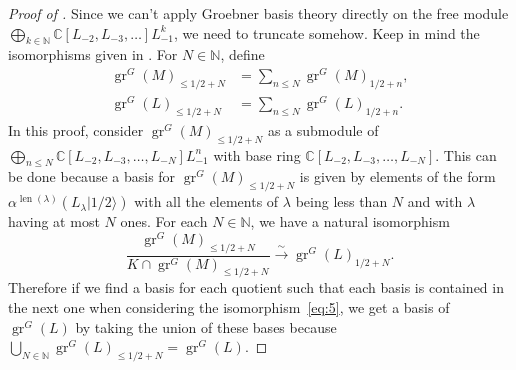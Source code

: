 \documentclass[12pt, a4paper]{article}
\DeclareMathOperator{\gr}{gr}
\DeclareMathOperator{\len}{len}
\newcommand{\vachalf}{|1/2\rangle}
\begin{document}
\begin{proof}[Proof of ]
  Since we can't apply Groebner basis theory directly on the free module $\bigoplus_{k\in \mathbb{N}}\mathbb{C}[L_{-2},L_{-3},\dots]L_{-1}^k$, we need to truncate somehow.
  Keep in mind the isomorphisms given in .
  For $N \in \mathbb{N}$, define
  \begin{align*}
    \gr^G(M)_{\le 1/2 + N} &= \sum_{n \le N}\gr^G(M)_{1/2 + n}, \\
    \gr^G(L)_{\le 1/2 + N} &= \sum_{n \le N}\gr^G(L)_{1/2 + n}.
  \end{align*}
  In this proof, consider $\gr^G(M)_{\le 1/2 + N}$ as a submodule of $\bigoplus_{n \le N}\mathbb{C}[L_{-2}, L_{-3}, \dots, L_{-N}]L_{-1}^n$ with base ring $\mathbb{C}[L_{-2}, L_{-3}, \dots, L_{-N}]$.
  This can be done because a basis for $\gr^G(M)_{\le 1/2 + N}$ is given by elements of the form $\alpha^{\len(\lambda)}(L_\lambda\vachalf)$ with all the elements of $\lambda$ being less than $N$ and with $\lambda$ having at most $N$ ones.
  For each $N \in \mathbb{N}$, we have a natural isomorphism
  \begin{equation}
    \label{eq:5}
    \frac{\gr^G(M)_{\le 1/2 + N}}{K \cap \gr^G(M)_{\le 1/2 + N}} \xrightarrow{\sim} \gr^G(L)_{1/2 + N}.
  \end{equation}
  Therefore if we find a basis for each quotient such that each basis is contained in the next one when considering the isomorphism~\eqref{eq:5}, we get a basis of $\gr^G(L)$ by taking the union of these bases because $\bigcup_{N \in \mathbb{N}}\gr^G(L)_{\le 1/2 + N} = \gr^G(L)$.
  

\end{proof}
\end{document}
